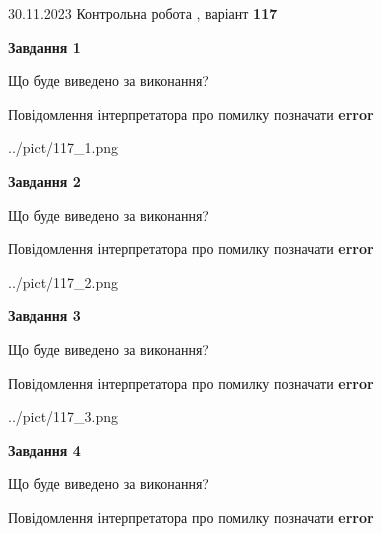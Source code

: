 \documentclass[12pt, ukrainian]{article}
\begin{document}
{{30.11.2023 Контрольна робота , варіант  \No \textbf { 117 }\par}}
{




{\begin {center}\textbf{Завдання 1}\end {center}}\par
Що буде виведено за виконання? \par
Повідомлення інтерпретатора про помилку позначати \textbf{error}

\begin{center}
	{../pict/117_1.png}
\end{center}
\newpage

{\begin {center}\textbf{Завдання 2}\end {center}}\par
Що буде виведено за виконання? \par
Повідомлення інтерпретатора про помилку позначати \textbf{error}

\begin{center}
	{../pict/117_2.png}
\end{center}
\newpage

{\begin {center}\textbf{Завдання 3}\end {center}}\par
Що буде виведено за виконання? \par
Повідомлення інтерпретатора про помилку позначати \textbf{error}

\begin{center}
	{../pict/117_3.png}
\end{center}
\newpage

{\begin {center}\textbf{Завдання 4}\end {center}}\par
Що буде виведено за виконання? \par
Повідомлення інтерпретатора про помилку позначати \textbf{error}

}
\end{document}
